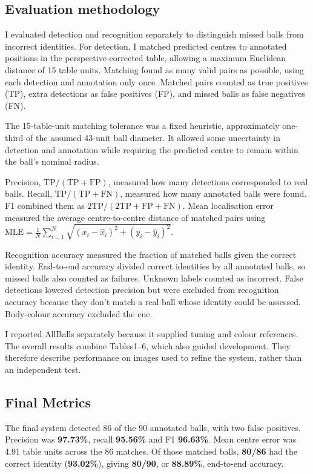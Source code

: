 \documentclass[12pt,a4paper]{article}
\begin{document}
\subsection{Evaluation methodology}
I evaluated detection and recognition separately to distinguish missed balls from incorrect 
identities. For detection, I matched predicted centres to annotated positions in the 
perspective-corrected table, allowing a maximum Euclidean distance of 15 table units. Matching 
found as many valid pairs as possible, using each detection and annotation only once. Matched 
pairs counted as true positives (TP), extra detections as false positives (FP), and missed balls 
as false negatives (FN).

The 15-table-unit matching tolerance was a fixed heuristic, approximately one-third of the 
assumed 43-unit ball diameter. It allowed some uncertainty in detection and annotation while 
requiring the predicted centre to remain within the ball’s nominal radius.

Precision, $\mathrm{TP}/(\mathrm{TP}+\mathrm{FP})$, measured how many detections
corresponded to real balls. Recall, $\mathrm{TP}/(\mathrm{TP}+\mathrm{FN})$,
measured how many annotated balls were found. F1 combined them as
$2\mathrm{TP}/(2\mathrm{TP}+\mathrm{FP}+\mathrm{FN})$.
Mean localisation error measured the average centre-to-centre distance of matched pairs using
$\mathrm{MLE}=\frac{1}{N}\sum_{i=1}^{N}
\sqrt{(x_i-\hat{x}_i)^2+(y_i-\hat{y}_i)^2}$.

Recognition accuracy measured the fraction of matched balls given the correct
identity. End-to-end accuracy divided correct identities by all annotated balls,
so missed balls also counted as failures. Unknown labels counted as incorrect.
False detections lowered detection precision but were excluded from recognition 
accuracy because they don't match a real ball whose identity could be assessed.
Body-colour accuracy excluded the cue.

I reported AllBalls separately because it supplied tuning and colour references.
The overall results combine Tables1--6, which also guided development. They therefore
describe performance on images used to refine the system, rather than an independent test.

\subsection{Final Metrics}
The final system detected 86 of the 90 annotated balls, with two false positives.
Precision was \textbf{97.73\%}, recall \textbf{95.56\%} and F1 \textbf{96.63\%}.
Mean centre error was 4.91 table units across the 86 matches. Of those matched
balls, \textbf{80/86} had the correct identity (\textbf{93.02\%}), giving
\textbf{80/90}, or \textbf{88.89\%}, end-to-end accuracy.
\end{document}
